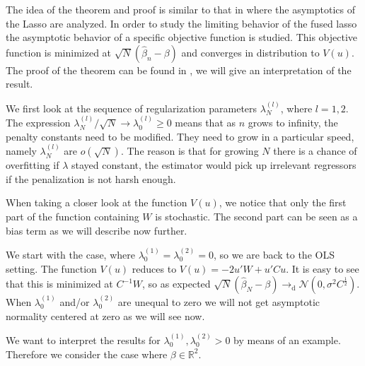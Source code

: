 \documentclass{article}
\theoremstyle{definition}
\DeclareMathOperator*{\argmin}{arg\,min}
\begin{document}
The idea of the theorem and proof is similar to that in \citep{asymptoticslasso} where the asymptotics of the Lasso are analyzed. In order to study the limiting behavior of the fused lasso the asymptotic behavior of a specific objective function is studied. This objective function is minimized at $\sqrt{N}(\hat{\beta}_n-\beta)$ and converges in distribution to $V(u)$. The proof of the theorem can be found in \citep{fused}, we will give an interpretation of the result.\newline

\noindent We first look at the sequence of regularization parameters $\lambda_N^{(l)}$, where $l=1,2$. The expression $\lambda_N^{(l)}/\sqrt{N} \rightarrow \lambda_0^{(l)} \geq 0$ means that as $n$ grows to infinity, the penalty constants need to be modified. They need to grow in a particular speed, namely $\lambda_N^{(l)}$ are $o(\sqrt{N})$. The reason is that for growing $N$ there is a chance of overfitting if $\lambda$ stayed constant, the estimator would pick up irrelevant regressors if the penalization is not harsh enough.\newline

When taking a closer look at the function $V(u)$, we notice that only the first part of the function containing $W$ is stochastic. The second part can be seen as a bias term as we will describe now further. \newline

We start with the case, where $\lambda_0^{(1)}= \lambda_0^{(2)} = 0$, so we are back to the OLS setting. The function $V(u)$ reduces to $V(u) = -2u'W + u'Cu$. It is easy to see that this is minimized at $C^{-1}W$, so as expected 		$\sqrt{N}(\hat{\beta}_N - \beta) \rightarrow_{\text{d}} \mathcal{N}(0,\sigma^2 C^{\frac{1}{2}})$.
When $\lambda_0^{(1)}$ and/or $\lambda_0^{(2)}$ are unequal to zero we will not get asymptotic normality centered at zero as we will see now. \newline

We want to interpret the results for $\lambda_0^{(1)}, \lambda_0^{(2)} > 0$ by means of an example. Therefore we consider the case where $\beta \in \mathbb{R}^2$.
%
\end{document}
